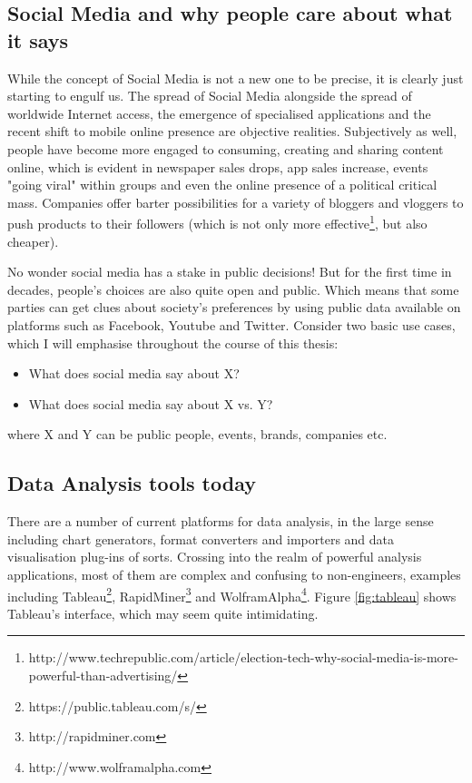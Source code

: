 \documentclass[12pt,a4paper,twoside]{report}
\begin{document}
\subsection{Social Media and why people care about what it says}

While the concept of Social Media is not a new one to be precise, it is clearly just starting to engulf us. The spread of Social Media alongside the spread of worldwide Internet access, the emergence of specialised applications and the recent shift to mobile online presence are objective realities. Subjectively as well, people have become more engaged to consuming, creating and sharing content online, which is evident in newspaper sales drops, app sales increase, events "going viral" within groups and even the online presence of a political critical mass. Companies offer barter possibilities for a variety of bloggers and vloggers to push products to their followers (which is not only more effective\footnote{http://www.techrepublic.com/article/election-tech-why-social-media-is-more-powerful-than-advertising/}, but also cheaper).

No wonder social media has a stake in public decisions! But for the first time in decades, people's choices are also quite open and public. Which means that some parties can get clues about society's preferences by using public data available on platforms such as Facebook, Youtube and Twitter. Consider two basic use cases, which I will emphasise throughout the course of this thesis:

\begin{itemize}
\item What does social media say about X?
\item What does social media say about X vs. Y?
\end{itemize}

where X and Y can be public people, events, brands, companies etc. 

\subsection{Data Analysis tools today}

There are a number of current platforms for data analysis, in the large sense including chart generators, format converters and importers and data visualisation plug-ins of sorts. Crossing into the realm of powerful analysis applications, most of them are complex and confusing to non-engineers, examples including Tableau\footnote{https://public.tableau.com/s/}, RapidMiner\footnote{http://rapidminer.com} and WolframAlpha\footnote{http://www.wolframalpha.com}. Figure \ref{fig:tableau} shows Tableau's interface, which may seem quite intimidating.
\end{document}
